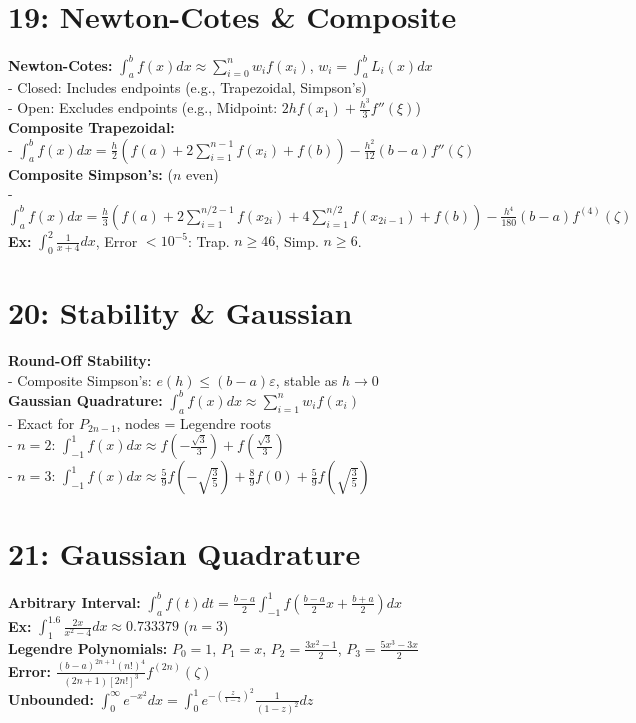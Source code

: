 \documentclass[9pt]{article}
\begin{document}
\begin{multicols}{2}
\section*{19: Newton-Cotes \& Composite}
\textbf{Newton-Cotes:} $\int_a^b f(x)dx \approx \sum_{i=0}^n w_if(x_i)$, $w_i = \int_a^b L_i(x)dx$ \\
- Closed: Includes endpoints (e.g., Trapezoidal, Simpson’s) \\
- Open: Excludes endpoints (e.g., Midpoint: $2hf(x_1) + \frac{h^3}{3}f''(\xi)$) \\
\textbf{Composite Trapezoidal:} \\
- $\int_a^b f(x)dx = \frac{h}{2}\left(f(a) + 2\sum_{i=1}^{n-1}f(x_i) + f(b)\right) - \frac{h^2}{12}(b-a)f''(\zeta)$ \\
\textbf{Composite Simpson’s:} ($n$ even) \\
- $\int_a^b f(x)dx = \frac{h}{3}\left(f(a) + 2\sum_{i=1}^{n/2-1}f(x_{2i}) + 4\sum_{i=1}^{n/2}f(x_{2i-1}) + f(b)\right) - \frac{h^4}{180}(b-a)f^{(4)}(\zeta)$ \\
\textbf{Ex:} $\int_0^2 \frac{1}{x+4}dx$, Error $< 10^{-5}$: Trap. $n \geq 46$, Simp. $n \geq 6$.

\section*{20: Stability \& Gaussian}
\textbf{Round-Off Stability:} \\
- Composite Simpson’s: $e(h) \leq (b-a)\varepsilon$, stable as $h \to 0$ \\
\textbf{Gaussian Quadrature:} $\int_a^b f(x)dx \approx \sum_{i=1}^n w_if(x_i)$ \\
- Exact for $P_{2n-1}$, nodes = Legendre roots \\
- $n=2$: $\int_{-1}^1 f(x)dx \approx f\left(-\frac{\sqrt{3}}{3}\right) + f\left(\frac{\sqrt{3}}{3}\right)$ \\
- $n=3$: $\int_{-1}^1 f(x)dx \approx \frac{5}{9}f\left(-\sqrt{\frac{3}{5}}\right) + \frac{8}{9}f(0) + \frac{5}{9}f\left(\sqrt{\frac{3}{5}}\right)$

\section*{21: Gaussian Quadrature}
\textbf{Arbitrary Interval:} $\int_a^b f(t)dt = \frac{b-a}{2} \int_{-1}^1 f\left(\frac{b-a}{2}x + \frac{b+a}{2}\right)dx$ \\
\textbf{Ex:} $\int_1^{1.6} \frac{2x}{x^2-4}dx \approx 0.733379$ ($n=3$) \\
\textbf{Legendre Polynomials:} $P_0=1$, $P_1=x$, $P_2=\frac{3x^2-1}{2}$, $P_3=\frac{5x^3-3x}{2}$ \\
\textbf{Error:} $\frac{(b-a)^{2n+1}(n!)^4}{(2n+1)[2n!]^3}f^{(2n)}(\zeta)$ \\
\textbf{Unbounded:} $\int_0^\infty e^{-x^2}dx = \int_0^1 e^{-\left(\frac{z}{1-z}\right)^2}\frac{1}{(1-z)^2}dz$


\end{multicols}
\end{document}

